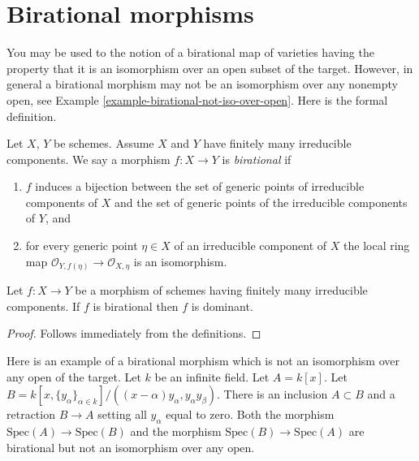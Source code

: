 \section{Birational morphisms}
\label{section-birational}

\noindent
You may be used to the notion of a birational map of varieties
having the property that it is an isomorphism over an open subset
of the target. However, in general a birational morphism may
not be an isomorphism over any nonempty open, see
Example \ref{example-birational-not-iso-over-open}.
Here is the formal definition.

\begin{definition}
\label{definition-birational}
Let $X$, $Y$ be schemes. Assume $X$ and $Y$ have finitely many
irreducible components. We say a morphism $f : X \to Y$ is
{\it birational} if
\begin{enumerate}
\item $f$ induces a bijection between the set of generic points
of irreducible components of $X$ and the set of generic points
of the irreducible components of $Y$, and
\item for every generic point $\eta \in X$ of an irreducible component
of $X$ the local ring map
$\mathcal{O}_{Y, f(\eta)} \to \mathcal{O}_{X, \eta}$
is an isomorphism.
\end{enumerate}
\end{definition}

\begin{lemma}
\label{lemma-birational-dominant}
Let $f : X \to Y$ be a morphism of schemes having finitely
many irreducible components. If $f$ is birational then
$f$ is dominant.
\end{lemma}

\begin{proof}
Follows immediately from the definitions.
\end{proof}

\begin{example}
\label{example-birational-not-iso-over-open}
Here is an example of a birational morphism which is not an isomorphism
over any open of the target.
Let $k$ be an infinite field.
Let $A = k[x]$. Let
$B = k[x, \{y_{\alpha}\}_{\alpha \in k}]/
((x-\alpha)y_\alpha, y_\alpha y_\beta)$.
There is an inclusion $A \subset B$ and a retraction $B \to A$
setting all $y_\alpha$ equal to zero.
Both the morphism $\text{Spec}(A) \to \text{Spec}(B)$
and the morphism $\text{Spec}(B) \to \text{Spec}(A)$ are birational
but not an isomorphism over any open.
\end{example}





